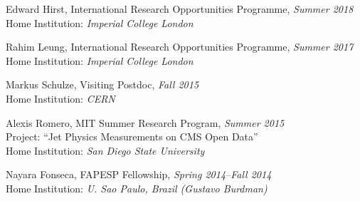 \item Edward Hirst, International Research Opportunities Programme, \emph{Summer 2018}
\\ \sh Home Institution: \emph{Imperial College London}

\item Rahim Leung, International Research Opportunities Programme, \emph{Summer 2017}
\\ \sh Home Institution: \emph{Imperial College London}

\item Markus Schulze, Visiting Postdoc, \emph{Fall 2015}
\\ \sh Home Institution: \emph{CERN}

\item Alexis Romero, MIT Summer Research Program, \emph{Summer 2015}
\\ \sh Project: ``Jet Physics Measurements on CMS Open Data''
\\ \sh Home Institution: \emph{San Diego State University}

\item Nayara Fonseca, FAPESP Fellowship, \emph{Spring 2014--Fall 2014}
\\ \sh Home Institution: \emph{U. Sao Paulo, Brazil (Gustavo Burdman)}

\el
